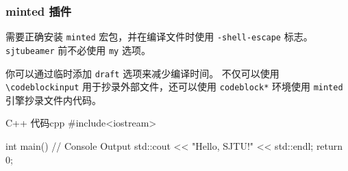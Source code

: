 \documentclass{ctexbeamer}
\begin{document}
\begin{frame}[fragile]  %
  \frametitle{minted 插件}
  需要正确安装 \texttt{minted} 宏包，并在编译文件时使用 \texttt{-shell-escape} 标志。\texttt{sjtubeamer} 前不必使用 \texttt{my} 选项。
\end{frame}
\begin{frame}[fragile]
  你可以通过临时添加 \texttt{draft} 选项来减少编译时间。
  不仅可以使用 \texttt{\textbackslash{}codeblockinput} 用于抄录外部文件，还可以使用 \texttt{codeblock*} 环境使用 \texttt{minted} 引擎抄录文件内代码。
\end{frame}
\begin{frame}[fragile]  %
  \begin{codeblock*}[]{C++ 代码}{cpp}
    #include<iostream>

    int main(){
        // Console Output
        std::cout << "Hello, SJTU!" << std::endl;
        return 0;
      }       \end{codeblock*}
\end{frame}
\end{document}
